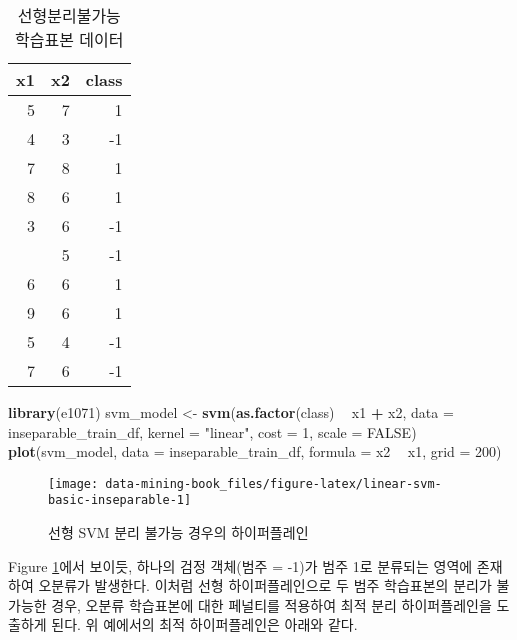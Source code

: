 \documentclass[]{book}
\newenvironment{Shaded}{\begin{snugshade}}{\end{snugshade}}
\newcommand{\DataTypeTok}[1]{\textcolor[rgb]{0.13,0.29,0.53}{#1}}
\newcommand{\DecValTok}[1]{\textcolor[rgb]{0.00,0.00,0.81}{#1}}
\newcommand{\KeywordTok}[1]{\textcolor[rgb]{0.13,0.29,0.53}{\textbf{#1}}}
\newcommand{\NormalTok}[1]{#1}
\newcommand{\OperatorTok}[1]{\textcolor[rgb]{0.81,0.36,0.00}{\textbf{#1}}}
\newcommand{\OtherTok}[1]{\textcolor[rgb]{0.56,0.35,0.01}{#1}}
\newcommand{\StringTok}[1]{\textcolor[rgb]{0.31,0.60,0.02}{#1}}
\begin{document}
\begin{table}[t]

\caption{\label{tab:svm-inseparable-train-data-table}선형분리불가능 학습표본 데이터}
\centering
\begin{tabular}{rrr}
\toprule
x1 & x2 & class\\
\midrule
5 & 7 & 1\\
4 & 3 & -1\\
7 & 8 & 1\\
8 & 6 & 1\\
3 & 6 & -1\\
\addlinespace
2 & 5 & -1\\
6 & 6 & 1\\
9 & 6 & 1\\
5 & 4 & -1\\
7 & 6 & -1\\
\bottomrule
\end{tabular}
\end{table}

\begin{Shaded}
\begin{Highlighting}[]
\KeywordTok{library}\NormalTok{(e1071)}
\NormalTok{svm_model <-}\StringTok{ }\KeywordTok{svm}\NormalTok{(}\KeywordTok{as.factor}\NormalTok{(class) }\OperatorTok{~}\StringTok{ }\NormalTok{x1 }\OperatorTok{+}\StringTok{ }\NormalTok{x2, }\DataTypeTok{data =}\NormalTok{ inseparable_train_df, }
                 \DataTypeTok{kernel =} \StringTok{"linear"}\NormalTok{, }\DataTypeTok{cost =} \DecValTok{1}\NormalTok{, }\DataTypeTok{scale =} \OtherTok{FALSE}\NormalTok{)}
\KeywordTok{plot}\NormalTok{(svm_model, }\DataTypeTok{data =}\NormalTok{ inseparable_train_df, }\DataTypeTok{formula =}\NormalTok{ x2 }\OperatorTok{~}\StringTok{ }\NormalTok{x1, }\DataTypeTok{grid =} \DecValTok{200}\NormalTok{)}
\end{Highlighting}
\end{Shaded}

\begin{figure}

{\centering \texttt{[image: data-mining-book\_files/figure-latex/linear-svm-basic-inseparable-1]} 

}

\caption{선형 SVM 분리 불가능 경우의 하이퍼플레인}\label{fig:linear-svm-basic-inseparable}
\end{figure}

Figure \ref{fig:linear-svm-basic-inseparable}에서 보이듯, 하나의 검정 객체(범주 = -1)가 범주 1로 분류되는 영역에 존재하여 오분류가 발생한다. 이처럼 선형 하이퍼플레인으로 두 범주 학습표본의 분리가 불가능한 경우, 오분류 학습표본에 대한 페널티를 적용하여 최적 분리 하이퍼플레인을 도출하게 된다. 위 예에서의 최적 하이퍼플레인은 아래와 같다.
\end{document}
